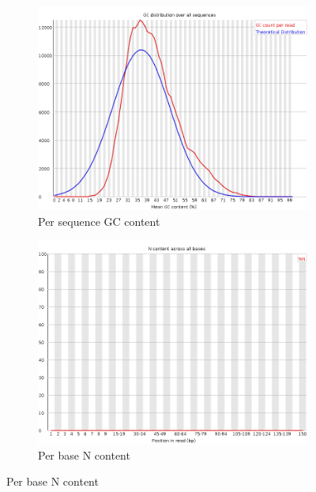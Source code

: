 \documentclass{article}
\begin{document}
\begin{figure}[htbp]
\begin{subfigure}{0.45\linewidth}
\includegraphics[width=\linewidth]{04-R1.qfilter_fastqc/Images/per_sequence_gc_content.png}
\caption{Per sequence GC content}
\end{subfigure}
\begin{subfigure}{0.45\linewidth}
\includegraphics[width=\linewidth]{04-R1.qfilter_fastqc/Images/per_base_n_content.png}
\caption{Per base N content}
\end{subfigure}
\end{figure}
\end{document}
